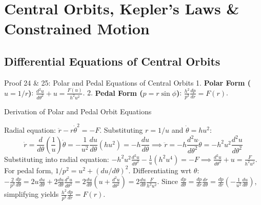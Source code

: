 \documentclass[11pt, a4paper]{report}
\begin{document}
\chapter{Central Orbits, Kepler's Laws \& Constrained Motion}

\section{Differential Equations of Central Orbits}

\begin{theorembox}{Proof 24 \& 25: Polar and Pedal Equations of Central Orbits}
1. \textbf{Polar Form ($u=1/r$)}: $\frac{d^2u}{d\theta^2} + u = \frac{F(u)}{h^2 u^2}$.
2. \textbf{Pedal Form ($p=r\sin\phi$)}: $\frac{h^2}{p^3} \frac{dp}{dr} = F(r)$.
\end{theorembox}

\begin{proofbox}{Derivation of Polar and Pedal Orbit Equations}
\begin{center}
\end{center}

Radial equation: $\ddot{r} - r\dot{\theta}^2 = -F$. Substituting $r = 1/u$ and $\dot{\theta} = h u^2$:
\[
\dot{r} = \frac{d}{d\theta}\left(\frac{1}{u}\right) \dot{\theta} = -\frac{1}{u^2}\frac{du}{d\theta}(h u^2) = -h \frac{du}{d\theta} \implies \ddot{r} = -h \frac{d^2u}{d\theta^2} \dot{\theta} = -h^2 u^2 \frac{d^2u}{d\theta^2}
\]
Substituting into radial equation: $-h^2 u^2 \frac{d^2u}{d\theta^2} - \frac{1}{u}(h^2 u^4) = -F \implies \frac{d^2u}{d\theta^2} + u = \frac{F}{h^2 u^2}$.\\
For pedal form, $1/p^2 = u^2 + (du/d\theta)^2$. Differentiating wrt $\theta$: $-\frac{2}{p^3}\frac{dp}{d\theta} = 2u\frac{du}{d\theta} + 2\frac{du}{d\theta}\frac{d^2u}{d\theta^2} = 2\frac{du}{d\theta}\left(u + \frac{d^2u}{d\theta^2}\right) = 2\frac{du}{d\theta}\frac{F}{h^2 u^2}$.
Since $\frac{dp}{d\theta} = \frac{dp}{dr}\frac{dr}{d\theta} = \frac{dp}{dr}\left(-\frac{1}{u^2}\frac{du}{d\theta}\right)$, simplifying yields $\frac{h^2}{p^3}\frac{dp}{dr} = F(r)$.
\end{proofbox}
\end{document}
